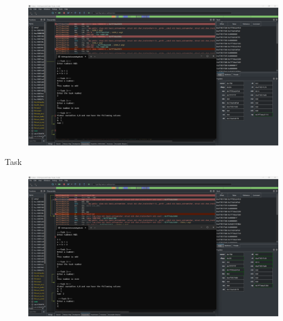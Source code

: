 \documentclass[a4paper,12pt]{article}
\newcommand{\RomanNumeralCaps}[1]{\MakeUppercase{\romannumeral #1}}
\begin{document}
\newpage
    \begin{figure}[h!]
        \begin{minipage}[h]{1\linewidth}
            \centering
            \includegraphics[width=1\linewidth]{Prt sc/4_3.png}  
        \end{minipage}
    \end{figure}
    \begin{center}
        \Large{Task \RomanNumeralCaps{5}}
    \end{center}
    \begin{figure}[h!]
        \begin{minipage}[h]{1\linewidth}
            \centering
            \includegraphics[width=1\linewidth]{Prt sc/5_1.png}  
        \end{minipage}
    \end{figure}
\end{document}
